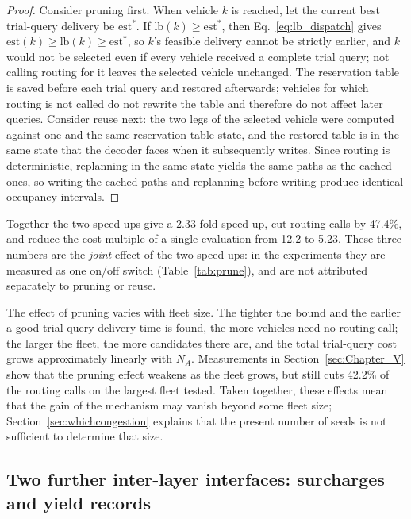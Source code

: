\documentclass[manuscript,screen,review]{acmart}
\newcommand{\RouteCallCutLo}{42.2\%}     %
\newcommand{\SpeedupProbe}{2.33}
\newcommand{\RouteCallCut}{47.4\%}
\newcommand{\CostMultBefore}{12.2}
\newcommand{\CostMultAfter}{5.23}
\begin{document}
\begin{proof}
  Consider pruning first. When vehicle $k$ is reached, let the current best trial-query delivery be $\mathrm{est}^{\ast}$.
  If $\mathrm{lb}(k)\ge \mathrm{est}^{\ast}$, then Eq.~\eqref{eq:lb_dispatch} gives
  $\mathrm{est}(k)\ge\mathrm{lb}(k)\ge\mathrm{est}^{\ast}$,
  so $k$'s feasible delivery cannot be strictly earlier, and $k$ would not be selected even if every vehicle received a complete trial query; not calling routing for it leaves the selected vehicle unchanged.
  The reservation table is saved before each trial query and restored afterwards; vehicles for which routing is not called do not rewrite the table and therefore do not affect later queries.
  Consider reuse next: the two legs of the selected vehicle were computed against one and the same reservation-table state, and the restored table is in the same state that the decoder faces when it subsequently writes.
  Since routing is deterministic, replanning in the same state yields the same paths as the cached ones, so writing the cached paths and replanning before writing produce identical occupancy intervals.
\end{proof}

Together the two speed-ups give a \SpeedupProbe{}-fold speed-up, cut routing calls by \RouteCallCut{}, and reduce the cost multiple of a single evaluation from \CostMultBefore{} to \CostMultAfter{}.
These three numbers are the \emph{joint} effect of the two speed-ups: in the experiments they are measured as one on/off switch (Table~\ref{tab:prune}), and are not attributed separately to pruning or reuse.

The effect of pruning varies with fleet size. The tighter the bound and the earlier a good trial-query delivery time is found, the more vehicles need no routing call; the larger the fleet, the more candidates there are, and the total trial-query cost grows approximately linearly with $N_A$.
Measurements in Section~\ref{sec:Chapter_V} show that the pruning effect weakens as the fleet grows, but still cuts \RouteCallCutLo{} of the routing calls on the largest fleet tested.
Taken together, these effects mean that the gain of the mechanism may vanish beyond some fleet size; Section~\ref{sec:whichcongestion} explains that the present number of seeds is not sufficient to determine that size.

\subsection{Two further inter-layer interfaces: surcharges and yield records}
\label{sec:interface}
\end{document}
